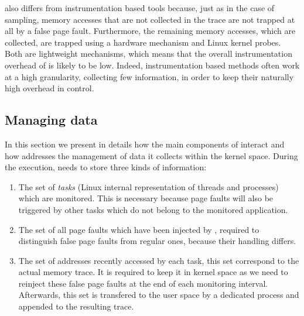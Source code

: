 \Moca also differs from instrumentation based tools because, just as in the case of sampling,
memory accesses that are not collected in the trace are not trapped at all by a false page fault. Furthermore, the
remaining memory accesses, which are collected, are trapped using a hardware mechanism and
Linux kernel probes. Both are lightweight mechanisms, which means that
the overall instrumentation overhead of \Moca is likely to be low.
Indeed, instrumentation based methods often work at a high granularity, collecting few information,
in order to keep their naturally high overhead in control.



\subsection{Managing data}
\label{sec:design-tech}

In this section we present in details how the main components of \Moca
interact and how \Moca addresses the management of data it collects
within the kernel space.
During the execution, \Moca needs to store three kinds of information:
\begin{enumerate}
    \item The set of \emph{tasks} (Linux internal representation of threads and processes) which are
monitored. This is necessary because page faults will also be triggered by other tasks which do not belong to
the monitored application.
    \item The set of all page faults which have been injected by \Moca,
        required to distinguish false page faults from regular ones, because their handling differs.
    \item The set of addresses recently accessed by each task, this set
        correspond to the actual memory trace. It is required to keep it in
        kernel space as we need to reinject these false page faults at the end of each monitoring interval. Afterwards,
        this set is transfered to the user space by a dedicated process and appended to the resulting trace.
\end{enumerate}

